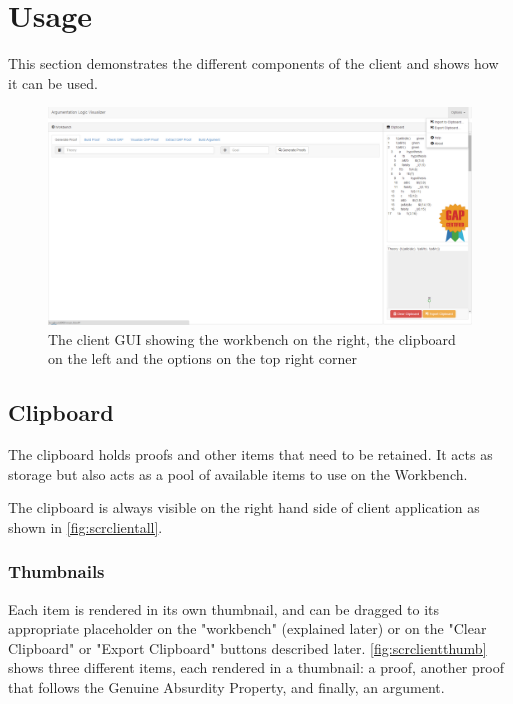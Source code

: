 \documentclass[11pt,twoside,a4paper]{report}
\begin{document}
\section{Usage}
This section demonstrates the different components of the client and shows how it can be used.

\begin{figure}[htp]
\centerline{\includegraphics[scale=0.3,angle=90]{img/scr-client-all.png}}
\caption{The client GUI showing the workbench on the right, the clipboard on the left and the options on the top right corner\label{fig:scrclientall}}
\end{figure}

\subsection{Clipboard}
The clipboard holds proofs and other items that need to be retained. It acts as storage but also acts as a pool of available items to use on the Workbench.

The clipboard is always visible on the right hand side of client application as shown in \autoref{fig:scrclientall}.

\subsubsection{Thumbnails}
Each item is rendered in its own thumbnail, and can be dragged to its appropriate placeholder on the "workbench" (explained later) or on the "Clear Clipboard" or "Export Clipboard" buttons described later. \autoref{fig:scrclientthumb} shows three different items, each rendered in a thumbnail: a proof, another proof that follows the Genuine Absurdity Property, and finally, an argument.
\end{document}
